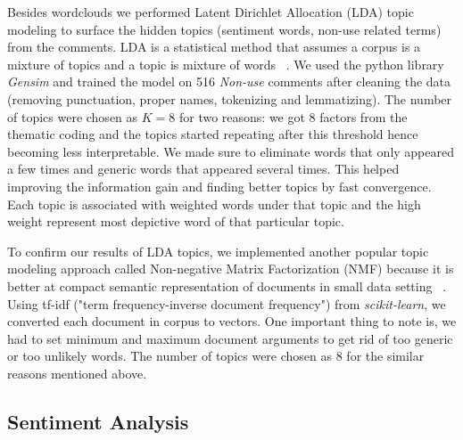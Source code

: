 Besides wordclouds we performed Latent Dirichlet Allocation (LDA) topic modeling \cite{blei2003latent} to surface the hidden topics (sentiment words, non-use related terms) from the comments. LDA is a statistical method that assumes a corpus is a mixture of topics and a topic is mixture of words ~\cite{suresh2015autodetection,wang2013gender}. We used the python library \textit{Gensim} and trained the model on 516 \textit{Non-use} comments after cleaning the data (removing punctuation, proper names, tokenizing and lemmatizing). The number of topics were chosen as $K=8$ for two reasons: we got 8 factors from the thematic coding and the topics started repeating after this threshold hence becoming less interpretable. We made sure to eliminate words that only appeared a few times and generic words that appeared several times. This helped improving the information gain and finding better topics by fast convergence. Each topic is associated with weighted words under that topic and the high weight represent most depictive word of that particular topic. 

To confirm our results of LDA topics, we implemented another popular topic modeling approach called Non-negative Matrix Factorization (NMF) because it is better at compact semantic representation of documents in small data setting ~\cite{choo2013utopian}. Using tf-idf ("term frequency-inverse document frequency") from \textit{scikit-learn}, we converted each document in corpus to vectors. One important thing to note is, we had to set minimum and maximum document arguments to get rid of too generic or too unlikely words. The number of topics were chosen as 8 for the similar reasons mentioned above.

\subsection{Sentiment Analysis}

